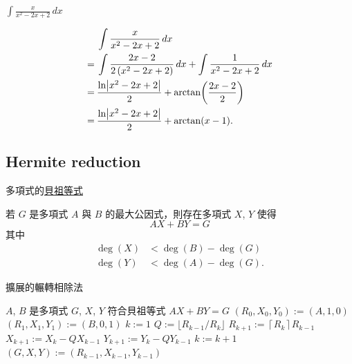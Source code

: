 \documentclass{beamer}
\newcommand{\Left} {\mathopen{}\mathclose\bgroup\left}
\newcommand{\Right}{\aftergroup\egroup\right}
\theoremstyle{remark}
\begin{document}
\begin{CJK}{UTF8}{bsmi}
\begin{frame}{$\displaystyle \int \frac{x}{x^2 - 2x + 2}\,dx$}
  \begin{solution}
    \begin{align*}
	 & \int \frac{x}{x^2 - 2x + 2}\,dx\\
      =\:& \int \frac{2x - 2}{2 \left( x^2 - 2x + 2 \right)}\,dx + \int \frac{1}{x^2 - 2x + 2}\,dx\\
      =\:& \frac{\ln \Left| x^2 - 2x + 2 \Right|}{2} + \arctan \Left( \frac{2x - 2}{2} \Right)\\
      =\:& \frac{\ln \Left| x^2 - 2x + 2 \Right|}{2} + \arctan(x-1).
    \end{align*}
  \end{solution}
\end{frame}

\subsection[Hermite red.]{Hermite reduction}
\begin{frame}{多項式的\href{http://zh.wikipedia.org/wiki/\%E8\%B2\%9D\%E7\%A5\%96\%E7\%AD\%89\%E5\%BC\%8F}{貝祖等式}}
  \begin{theorem}
    若 $G$ 是多項式 $A$ 與 $B$ 的最大公因式，則存在多項式 $X$, $Y$ 使得
    \[AX + BY = G\]
    其中
    \begin{align*}
      \deg(X) &< \deg(B) - \deg(G)\\
      \deg(Y) &< \deg(A) - \deg(G).
    \end{align*}
  \end{theorem}
\end{frame}

\begin{frame}{擴展的輾轉相除法}
  \begin{algorithm}[H]
    \caption{擴展的輾轉相除法}
    \begin{algorithmic}[1]
      \REQUIRE $A$, $B$ 是多項式
      \ENSURE  $G$, $X$, $Y$ 符合貝祖等式 $AX + BY = G$
      \STATE $(R_0, X_0, Y_0) := (A, 1, 0)$ 
      \STATE $(R_1, X_1, Y_1) := (B, 0, 1)$ 
      \STATE $k := 1$
	\STATE $Q := \lfloor R_{k-1} / R_k \rfloor$
	\STATE $R_{k+1} := \left\lceil R_k \right\rceil R_{k-1}$
	\STATE $X_{k+1} := X_k - QX_{k-1}$
	\STATE $Y_{k+1} := Y_k - QY_{k-1}$
	\STATE $k := k+1$ 
      \ENDWHILE
      \STATE $(G,X,Y) := (R_{k-1}, X_{k-1}, Y_{k-1})$
    \end{algorithmic}
  \end{algorithm}
\end{frame}


\end{CJK}
\end{document}
